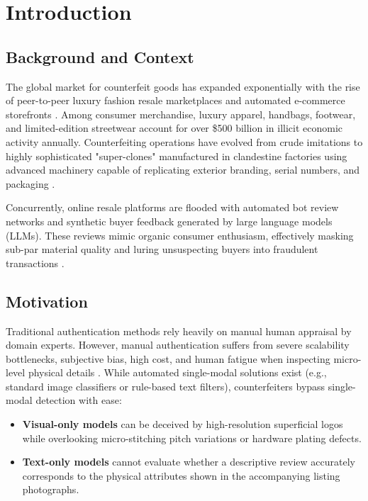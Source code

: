 \chapter{Introduction}

\section{Background and Context}
The global market for counterfeit goods has expanded exponentially with the rise of peer-to-peer luxury fashion resale marketplaces and automated e-commerce storefronts \cite{oecd2020trade}. Among consumer merchandise, luxury apparel, handbags, footwear, and limited-edition streetwear account for over \$500 billion in illicit economic activity annually. Counterfeiting operations have evolved from crude imitations to highly sophisticated "super-clones" manufactured in clandestine factories using advanced machinery capable of replicating exterior branding, serial numbers, and packaging \cite{smith2022computer}.

Concurrently, online resale platforms are flooded with automated bot review networks and synthetic buyer feedback generated by large language models (LLMs). These reviews mimic organic consumer enthusiasm, effectively masking sub-par material quality and luring unsuspecting buyers into fraudulent transactions \cite{zhang2023nlp}.

\section{Motivation}
Traditional authentication methods rely heavily on manual human appraisal by domain experts. However, manual authentication suffers from severe scalability bottlenecks, subjective bias, high cost, and human fatigue when inspecting micro-level physical details \cite{patel2023deep}. While automated single-modal solutions exist (e.g., standard image classifiers or rule-based text filters), counterfeiters bypass single-modal detection with ease:
\begin{itemize}
    \item \textbf{Visual-only models} can be deceived by high-resolution superficial logos while overlooking micro-stitching pitch variations or hardware plating defects.
    \item \textbf{Text-only models} cannot evaluate whether a descriptive review accurately corresponds to the physical attributes shown in the accompanying listing photographs.
\end{itemize}

